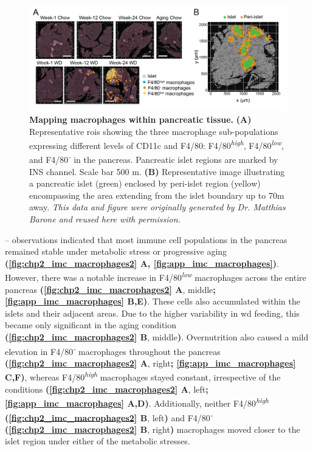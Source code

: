 \begin{figure}[H]
    \centering
    \includegraphics[width=\linewidth]{Chapter4/Fig/F2-9-01.png}
    \caption[Mapping macrophages within pancreatic tissue]{\textbf{Mapping macrophages within pancreatic tissue.} \textbf{(A)} Representative \glspl{roi} showing the three macrophage sub-populations expressing different levels of CD11c and F4/80: F4/80\textsuperscript{\textit{high}}, F4/80\textsuperscript{\textit{low}}, and F4/80\textsuperscript{\textit{-}} in the pancreas. Pancreatic islet regions are marked by INS channel. Scale bar 500 \textmu m. \textbf{(B)} Representative image illustrating a pancreatic islet (green) enclosed by peri-islet region (yellow) encompassing the area extending from the islet boundary up to 70\textmu m away. \textit{This data and figure were originally generated by Dr. Matthias Barone and reused here with permission.}}
    \label{fig:chp2_imc_macrophages1}
\end{figure}
 
-- observations indicated that most immune cell populations in the pancreas remained stable under metabolic stress or progressive aging \textbf{(\autoref{fig:chp2_imc_macrophages2} A, \autoref{fig:app_imc_macrophages})}. However, there was a notable increase in F4/80\textsuperscript{\textit{low}} macrophages across the entire pancreas \textbf{(\autoref{fig:chp2_imc_macrophages2} A}, middle\textbf{; \autoref{fig:app_imc_macrophages} B,E)}. These cells also accumulated within the islets and their adjacent areas. Due to the higher variability in \gls{wd} feeding, this became only significant in the aging condition \textbf{(\autoref{fig:chp2_imc_macrophages2} B}, middle\textbf{)}. Overnutrition also caused a mild elevation in F4/80\textsuperscript{\textit{-}} macrophages throughout the pancreas \textbf{(\autoref{fig:chp2_imc_macrophages2} A}, right\textbf{; \autoref{fig:app_imc_macrophages} C,F)}, whereas F4/80\textsuperscript{\textit{high}} macrophages stayed constant, irrespective of the conditions \textbf{(\autoref{fig:chp2_imc_macrophages2} A}, left\textbf{; \autoref{fig:app_imc_macrophages} A,D)}. Additionally, neither F4/80\textsuperscript{\textit{high}} \textbf{(\autoref{fig:chp2_imc_macrophages2} B}, left\textbf{)}  and F4/80\textsuperscript{\textit{-}} \textbf{(\autoref{fig:chp2_imc_macrophages2} B}, right\textbf{)} macrophages moved closer to the islet region under either of the metabolic stresses.\\

